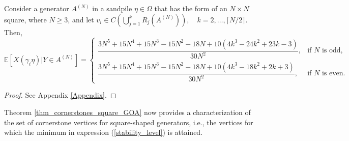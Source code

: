 \documentclass{article}
\begin{document}
\begin{lemma}\label{lem_cornerstones_C}
    Consider a generator $A^{(N)}$ in a sandpile $\eta \in \Omega$ that has the form of an $N \times N$ square, where $N \geq 3$, and let $v_i \in C\left(\bigcup_{j=1}^k R_j(A^{(N)}) \right), \quad k = 2, \ldots, \lceil N/2 \rceil$.  Then,
    \begin{equation}\label{Exp_av_size_C}
        \mathbb{E}[X(\gamma_i \eta)|Y \in A^{(N)}] = \begin{cases}
            \dfrac{3N^5 + 15N^4 + 15N^3-15N^2 - 18N+10(4k^3 - 24k^2+23k-3)}{30N^2}, &\text{if } N \text{ is odd,} \\[1.2em]
            \dfrac{3N^5 + 15N^4 + 15N^3 - 15N^2 - 18N + 10(4k^3 - 18k^2 + 2k + 3)}{30N^2}, &\text{if } N \text{ is even.}
        \end{cases}
    \end{equation}
\end{lemma}
\begin{proof}
    See Appendix \ref{Appendix}.
\end{proof}




Theorem \ref{thm_cornerstones_square_GOA} now provides a characterization of the set of cornerstone vertices for square-shaped generators, i.e., the vertices for which the minimum in expression (\ref{stability_level}) is attained.
\end{document}
